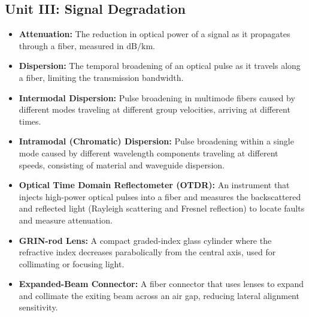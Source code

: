 \subsection{Unit III: Signal Degradation}
\begin{itemize}
  \item   \textbf{Attenuation:} The reduction in optical power of a signal as it propagates through a fiber, measured in $\text{dB/km}$.
  \item   \textbf{Dispersion:} The temporal broadening of an optical pulse as it travels along a fiber, limiting the transmission bandwidth.
  \item   \textbf{Intermodal Dispersion:} Pulse broadening in multimode fibers caused by different modes traveling at different group velocities, arriving at different times.
  \item   \textbf{Intramodal (Chromatic) Dispersion:} Pulse broadening within a single mode caused by different wavelength components traveling at different speeds, consisting of material and waveguide dispersion.
  \item   \textbf{Optical Time Domain Reflectometer (OTDR):} An instrument that injects high-power optical pulses into a fiber and measures the backscattered and reflected light (Rayleigh scattering and Fresnel reflection) to locate faults and measure attenuation.
  \item   \textbf{GRIN-rod Lens:} A compact graded-index glass cylinder where the refractive index decreases parabolically from the central axis, used for collimating or focusing light.
  \item   \textbf{Expanded-Beam Connector:} A fiber connector that uses lenses to expand and collimate the exiting beam across an air gap, reducing lateral alignment sensitivity.
\end{itemize}


